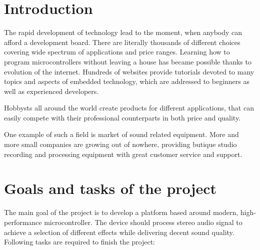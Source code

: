 \documentclass[a4paper,twoside,12pt]{book}
\begin{document}
\chapter{Introduction}
The rapid development of technology lead to the moment,
when anybody can afford a development board.
There are literally thousands of different choices
covering wide spectrum of applications and price ranges.
Learning how to program microcontrollers without leaving a house
has became possible thanks to evolution of the internet.
Hundreds of websites provide tutorials devoted to
many topics and aspects of embedded technology,
which are addressed to beginners as well as 
experienced developers.

Hobbysts all around the world create products for different applications,
that can easily compete with their professional counterparts in both price and quality.

One example of such a field is market of sound related equipment.
More and more small companies are growing out of nowhere,
providing butique studio recording and processing equipment
with great customer service and support.




\chapter{Goals and tasks of the project}
The main goal of the project is to develop a platform based around modern,
high-performance microcontroller.
The device should process stereo audio signal to achieve a selection of different effects
while delivering decent sound quality.
Following tasks are required to finish the project:
\end{document}
